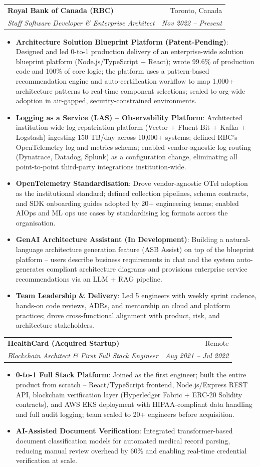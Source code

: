 \documentclass[letterpaper,9.5pt]{article}
\makeatletter
\newcommand{\resumeItem}[2]{\item\small{\textbf{#1}{: #2 \vspace{-2pt}}}}
\newcommand{\resumeSubheading}[4]{\vspace{-2pt}\item\begin{tabular*}{0.97\textwidth}{l@{\extracolsep{\fill}}r}\textbf{#1} & #2 \\\textit{\small#3} & \textit{\small #4} \\\end{tabular*}\vspace{-6pt}}
\newcommand{\resumeItemListStart}{\begin{itemize}}
\newcommand{\resumeItemListEnd}{\end{itemize}\vspace{-6pt}}
\makeatother
\begin{document}
  \resumeSubheading
    {Royal Bank of Canada (RBC)}{Toronto, Canada}
    {Staff Software Developer \& Enterprise Architect}{Nov 2022 -- Present}
  \resumeItemListStart
    \resumeItem{Architecture Solution Blueprint Platform (Patent-Pending)}{Designed and led 0-to-1 production delivery of an enterprise-wide solution blueprint platform (Node.js/TypeScript + React); wrote 99.6\% of production code and 100\% of core logic; the platform uses a pattern-based recommendation engine and auto-certification workflow to map 1,000+ architecture patterns to real-time component selections; scaled to org-wide adoption in air-gapped, security-constrained environments.}
    \resumeItem{Logging as a Service (LAS) -- Observability Platform}{Architected institution-wide log repatriation platform (Vector + Fluent Bit + Kafka + Logstash) ingesting 150 TB/day across 10,000+ systems; defined RBC's OpenTelemetry log and metrics schema; enabled vendor-agnostic log routing (Dynatrace, Datadog, Splunk) as a configuration change, eliminating all point-to-point third-party integrations institution-wide.}
    \resumeItem{OpenTelemetry Standardisation}{Drove vendor-agnostic OTel adoption as the institutional standard; defined collection pipelines, schema contracts, and SDK onboarding guides adopted by 20+ engineering teams; enabled AIOps and ML ops use cases by standardising log formats across the organisation.}
    \resumeItem{GenAI Architecture Assistant (In Development)}{Building a natural-language architecture generation feature (ASB Assist) on top of the blueprint platform -- users describe business requirements in chat and the system auto-generates compliant architecture diagrams and provisions enterprise service recommendations via an LLM + RAG pipeline.}
    \resumeItem{Team Leadership \& Delivery}{Led 5 engineers with weekly sprint cadence, hands-on code reviews, ADRs, and mentorship on cloud and platform practices; drove cross-functional alignment with product, risk, and architecture stakeholders.}
  \resumeItemListEnd

  \resumeSubheading
    {HealthCard (Acquired Startup)}{Remote}
    {Blockchain Architect \& First Full Stack Engineer}{Aug 2021 -- Jul 2022}
  \resumeItemListStart
    \resumeItem{0-to-1 Full Stack Platform}{Joined as the first engineer; built the entire product from scratch -- React/TypeScript frontend, Node.js/Express REST API, blockchain verification layer (Hyperledger Fabric + ERC-20 Solidity contracts), and AWS EKS deployment with HIPAA-compliant data handling and full audit logging; team scaled to 20+ engineers before acquisition.}
    \resumeItem{AI-Assisted Document Verification}{Integrated transformer-based document classification models for automated medical record parsing, reducing manual review overhead by 60\% and enabling real-time credential verification at scale.}
  \resumeItemListEnd
\end{document}
